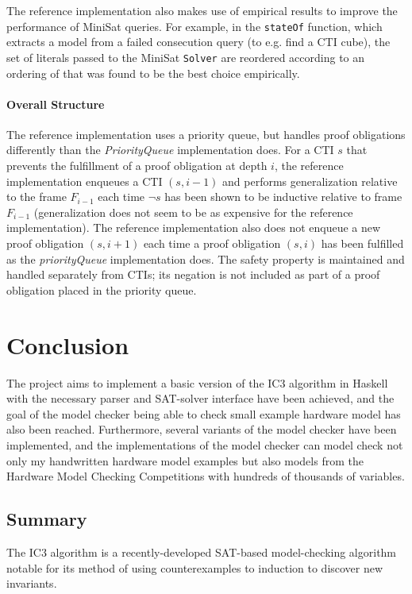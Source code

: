 \documentclass[12pt,a4paper,twoside,openright]{report}
\begin{document}
{The reference implementation also makes use of empirical results to improve the performance of MiniSat queries.
For example, in the \verb,stateOf, function, which extracts a model from a failed consecution query
(to e.g. find a CTI cube), the set of literals passed to the MiniSat \verb,Solver, are reordered according
to an ordering of that was found to be the best choice empirically.

\subsubsection{Overall Structure}

The reference implementation uses a priority queue, but handles proof obligations differently
than the {\it PriorityQueue} implementation does. For a CTI $s$ that prevents the fulfillment
of a proof obligation at depth $i$, the reference implementation enqueues a CTI $(s,i - 1)$
and performs generalization relative to the frame $F_{i - 1}$ each time $\neg s$ has been shown
to be inductive relative to frame $F_{i - 1}$ (generalization does not seem
to be as expensive for the reference implementation). The reference implementation also does not
enqueue a new proof obligation $(s, i+1)$ each time a proof obligation $(s, i)$ has been
fulfilled as the {\it priorityQueue} implementation does. The safety property is maintained and
handled separately from CTIs; its negation is not included as part of a proof obligation
placed in the priority queue.

\chapter{Conclusion}

The project aims to implement a basic version of the IC3 algorithm in Haskell with the necessary parser
and SAT-solver interface have been achieved, and the goal of the model checker being able to check
small example hardware model has also been reached. Furthermore, several variants of the model checker
have been implemented, and the implementations of the model checker can model check not only
my handwritten hardware model examples but also models from the Hardware Model Checking Competitions with hundreds
of thousands of variables.

\section{Summary}

The IC3 algorithm is a recently-developed SAT-based model-checking algorithm notable for its method of
using counterexamples to induction to discover new invariants.

}
\end{document}

